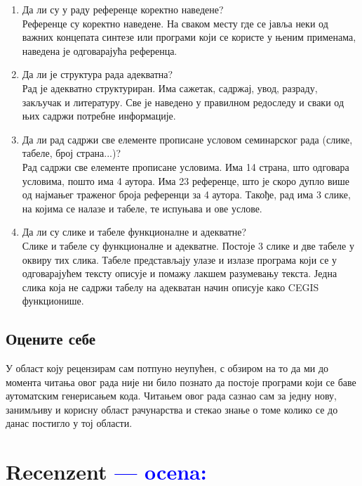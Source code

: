 \documentclass[a4paper]{report}
\newcommand{\odgovor}[1]{\textcolor{blue}{#1}}
\begin{document}
\begin{enumerate}
\item Да ли су у раду референце коректно наведене?\\
Референце су коректно наведене. На сваком месту где се јавља неки од важних концепата синтезе или програми који се користе у њеним применама, наведена је одговарајућа референца.

\item Да ли је структура рада адекватна?\\
Рад је адекватно структуриран. Има сажетак, садржај, увод, разраду, закључак и литературу. Све је наведено у правилном редоследу и сва\-ки од њих садржи потребне информације.

\item Да ли рад садржи све елементе прописане условом семинарског рада (слике, табеле, број страна...)?\\
Рад садржи све елементе прописане условима. Има 14 страна, што одговара условима, пошто има 4 аутора. Има 23 референце, што је скоро дупло више од најмањег траженог броја референци за 4 аутора. Такође, рад има 3 слике, на којима се налазе и табеле, те испуњава и ове услове.

\item Да ли су слике и табеле функционалне и адекватне?\\
Слике и табеле су функционалне и адекватне. Постоје 3 слике и две табеле у оквиру тих слика. Табеле представљају улазе и излазе програма који се у одговарајућем тексту описује и помажу лакшем разумевању текста. Једна слика која не садржи табелу на адекватан начин описује како CEGIS функционише.

\end{enumerate}

\section{Оцените себе}
\par У област коју рецензирам сам потпуно неупућен, с обзиром на то да ми до момента читања овог рада није ни било познато да постоје програми који се баве аутоматским генерисањем кода. Читањем овог рада сазнао сам за једну нову, занимљиву и корисну област рачунарства и стекао знање о томе колико се до данас постигло у тој области.

\chapter{Recenzent \odgovor{--- ocena:} }
\end{document}
